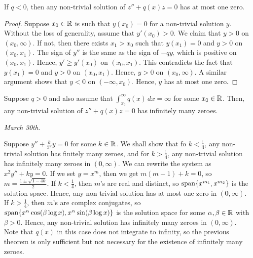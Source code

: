 \begin{theorem}
    If $q < 0$, then any non-trivial solution of $z'' + q(x) z = 0$ has at most one zero.
\end{theorem}
\begin{proof}
    Suppose $x_{0} \in \mathbb{R}$ is such that $y(x_{0}) = 0$ for a non-trivial solution $y$. Without the loss of generality, assume that $y'(x_{0}) > 0$. We claim that $y > 0$ on $(x_{0},\infty)$. If not, then there exists $x_{1} > x_{0}$ such that $y(x_{1}) = 0$ and $y > 0$ on $(x_{0},x_{1})$. The sign of $y''$ is the same as the sign of $-q y$, which is positive on $(x_{0},x_{1})$. Hence, $y' \geq y'(x_{0})$ on $(x_{0},x_{1})$. This contradicts the fact that $y(x_{1}) = 0$ and $y > 0$ on $(x_{0},x_{1})$. Hence, $y > 0$ on $(x_{0},\infty)$. A similar argument shows that $y < 0$ on $(-\infty,x_{0})$. Hence, $y$ has at most one zero.
\end{proof}

\begin{theorem}
    Suppose $q > 0$ and also assume that $\int_{x_{0}}^{\infty} q(x) \, dx = \infty$ for some $x_{0} \in \mathbb{R}$. Then, any non-trivial solution of $z'' + q(x) z = 0$ has infinitely many zeroes.
\end{theorem}


\textit{March 30th.}

\begin{example}
    Suppose $y'' + \frac{k}{x^{2}} y = 0$ for some $k \in \mathbb{R}$. We shall show that fo $k < \frac{1}{4}$, any non-trivial solution has finitely many zeroes, and for $k > \frac{1}{4}$, any non-trivial solution has infinitely many zeroes in $(0,\infty)$. We can rewrite the system as $x^{2} y'' + ky = 0$. If we set $y = x^{m}$, then we get $m(m-1) + k = 0$, so $m = \frac{1 \pm \sqrt{1-4k}}{2}$. If $k < \frac{1}{4}$, then $m$'s are real and distinct, so $\operatorname{span} \{x^{m_{1}}, x^{m_{2}}\}$ is the solution space. Hence, any non-trivial solution has at most one zero in $(0,\infty)$. If $k > \frac{1}{4}$, then $m$'s are complex conjugates, so $\operatorname{span} \{x^{\alpha} \cos (\beta \log x), x^{\alpha} \sin (\beta \log x)\}$ is the solution space for some $\alpha,\beta \in \mathbb{R}$ with $\beta > 0$. Hence, any non-trivial solution has infinitely many zeroes in $(0,\infty)$. Note that $q(x)$ in this case does not integrate to infinity, so the previous theorem is only sufficient but not necessary for the existence of infinitely many zeroes.
\end{example}

